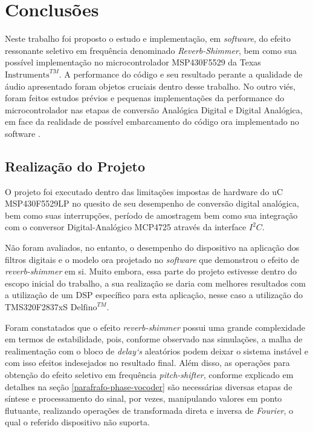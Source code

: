 \chapter{Conclusões}

	Neste trabalho foi proposto o estudo e implementação, em \textit{software}, do efeito ressonante seletivo em frequência denominado \textit{Reverb-Shimmer}, bem como sua possível implementação no microcontrolador MSP430F5529 da Texas $\text{Instruments}^{TM}$. A performance do código e seu resultado perante a qualidade de áudio apresentado foram objetos cruciais dentro desse trabalho. No outro viés, foram feitos estudos prévios e pequenas implementações da performance do microcontrolador nas etapas de conversão Analógica Digital e Digital Analógica, em face da realidade de possível embarcamento do código ora implementado no software \MATLAB.

 			
	\section{Realização do Projeto}
	\label{realizacao-projeto}
		O projeto foi executado dentro das limitações impostas de hardware do uC MSP430F5529LP no quesito de seu desempenho de conversão digital analógica, bem como suas interrupções, período de amostragem bem como sua integração com o conversor Digital-Analógico MCP4725 através da interface $ I^2C $.
		
		Não foram avaliados, no entanto, o desempenho do dispositivo na aplicação dos filtros digitais e o modelo ora projetado no \textit{software} \MATLAB que demonstrou o efeito de \textit{reverb-shimmer} em si. Muito embora, essa parte do projeto estivesse dentro do escopo inicial do trabalho, a sua realização se daria com melhores resultados com a utilização de um DSP específico para esta aplicação, nesse caso a utilização do TMS320F2837xS $\text{Delfino}^{TM}$.
		
		Foram constatados que o efeito \textit{reverb-shimmer} possui uma grande complexidade em termos de estabilidade, pois, conforme observado nas simulações, a malha de realimentação com o bloco de \textit{delay`s} aleatórios podem deixar o sistema instável e com isso efeitos indesejados no resultado final. Além disso, as operações para obtenção do efeito seletivo em frequência \textit{pitch-shifter}, conforme explicado em detalhes na seção \ref{parafrafo-phase-vocoder} são necessárias diversas etapas de síntese e processamento do sinal, por vezes, manipulando valores em ponto flutuante, realizando operações de transformada direta e inversa de \textit{Fourier}, o qual o referido dispositivo não suporta.
		
